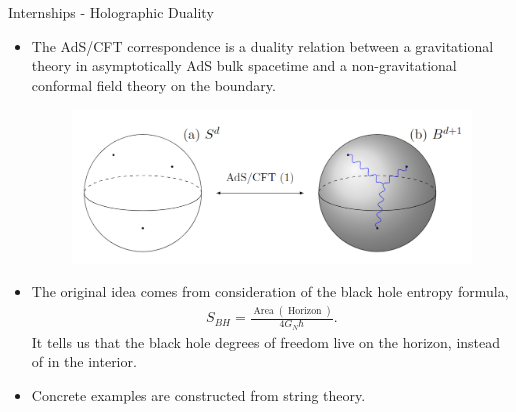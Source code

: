 \documentclass{beamer}
\newcommand{\hb}{\hbar}
\newcommand{\zt}{\operatorname}
\newcommand{\eq}[1]{\begin{equation}\begin{aligned}{}#1\end{aligned}\end{equation}}
\begin{document}
\begin{frame}{Internships - Holographic Duality}
\begin{itemize}

\item The AdS/CFT correspondence is a duality relation between a gravitational theory in asymptotically AdS bulk spacetime and a non-gravitational conformal field theory on the boundary.

\begin{figure}[htb]
    \centering
    \includegraphics[scale=0.35]{Figures/ads cft.png}
\end{figure}

\item The original idea comes from consideration of the black hole entropy formula,
\eq{S_{BH}=\frac{\zt{Area}(\zt{Horizon})}{4G_N\hb}.}
It tells us that the black hole degrees of freedom live on the horizon, instead of in the interior.

\item Concrete examples are constructed from string theory.

\end{itemize}
\end{frame}
\end{document}
